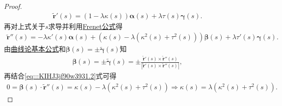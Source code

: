 \documentclass[../../main.tex]{subfiles}%
\begin{document}
\begin{proof}
\begin{align*}
\tilde{\bm{r}}'(s) = \left(1 - \lambda\kappa(s)\right)\bm{\alpha}(s) + \lambda\tau(s)\bm{\gamma}(s).
\end{align*}
再对上式关于$s$求导并利用\hyperref[theorem:微分几何-Frenet公式]{Frenet公式}得
\begin{align}
\tilde{\bm{r}}''(s)
= -\lambda\kappa'(s)\bm{\alpha}(s)
+ \left( \kappa(s) - \lambda\left( \kappa^2(s) + \tau^2(s) \right) \right)\bm{\beta}(s)
+ \lambda\tau'(s)\bm{\gamma}(s).
\label{eq:::KIHJ3jf90w3931.2}
\end{align}
由\hyperref[theorem:曲线论基本公式]{曲线论基本公式}和$\bm{\beta}(s) = \pm \tilde{\bm{\gamma}}(s)$知
\begin{align*}
\bm{\beta}(s) = \pm \tilde{\bm{\gamma}}(s)
= \pm \frac{\tilde{\bm{r}}'(s) \times \tilde{\bm{r}}''(s)}{\left| \tilde{\bm{r}}'(s) \times \tilde{\bm{r}}''(s) \right|},
\end{align*}
再结合\eqref{eq:::KIHJ3jf90w3931.2}式可得
\begin{align*}
0 = \bm{\beta}(s) \cdot \tilde{\bm{r}}''(s)
= \kappa(s) - \lambda\left( \kappa^2(s) + \tau^2(s) \right)
\Longrightarrow \kappa(s) = \lambda\left( \kappa^2(s) + \tau^2(s) \right).
\end{align*}

\end{proof}
\end{document}
